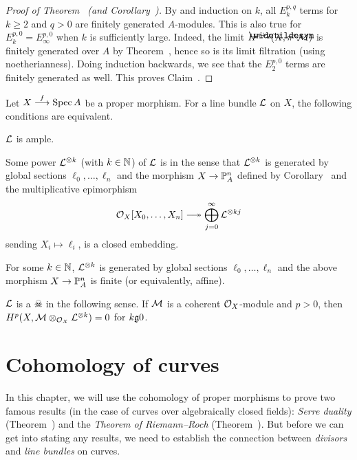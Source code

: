 \documentclass[a4paper,parskip=half,numbers=enddot, DIV=12]{scrreprt}
\renewcommand{\geq}{\geqslant}
\begin{document}
\begin{proof}[Proof of Theorem~ (and Corollary~)]
	By  and induction on $k$, all $E_k^{p,q}$ terms for $k\geq 2$ and $q>0$ are finitely generated $A$-modules. This is also true for $E_k^{p,0}=E_\infty^{p,0}$ when $k$ is sufficiently large. Indeed, the limit $H^{p+q}(\snake{X},\pi^*\Mm)$ is finitely generated over $A$ by Theorem~, hence so is its limit filtration (using noetherianness). Doing induction backwards, we see that the $E_2^{p,0}$ terms are finitely generated as well. This proves Claim~.
\end{proof}
\begin{thm}
	Let $X\morphism[f]\Spec A$ be a proper morphism. For a line bundle $\mathcal{L}$ on $X$, the following conditions are equivalent.
	\begin{alphanumerate}
		\item $\mathcal{L}$ is ample.
		\item Some power $\mathcal{L}^{\otimes k}$ (with $k\in\mathbb{N}$) of $\mathcal{L}$ is  in the sense that $\mathcal{L}^{\otimes k}$ is generated by global sections $\ell_0,\ldots,\ell_n$ and the morphism $X\morphism\IP_A^n$ defined by Corollary~ and the multiplicative epimorphism 
		\begin{align*}
			\Oo_X[X_0,\ldots,X_n]\epimorphism\bigoplus_{j=0}^\infty\Ll^{\otimes kj}
		\end{align*}
		sending $X_i\mapsto \ell_i$, is a closed embedding.
		\item For some $k\in\mathbb{N}$, $\mathcal{L}^{\otimes k}$ is generated by global sections $\ell_0,\ldots,\ell_n$ and the above morphism $X\morphism\IP_A^n$ is finite (or equivalently, affine).
		\item $\mathcal{L}$ is a $\skull$ in the following sense. If $\mathcal{M}$ is a coherent $\mathcal{O}_X$-module and $p>0$, then $H^p(X,\mathcal{M}\otimes_{\mathcal{O}_X}\mathcal{L}^{\otimes k})=0$ for $k\gge 0$.
	\end{alphanumerate}
\end{thm}

\chapter{Cohomology of curves}
In this chapter, we will use the cohomology of proper morphisms to prove two famous results (in the case of curves over algebraically closed fields): \emph{Serre duality} (Theorem~) and the \emph{Theorem of Riemann--Roch} (Theorem~). But before we can get into stating any results, we need to establish the connection between \emph{divisors} and \emph{line bundles} on curves.
\end{document}
